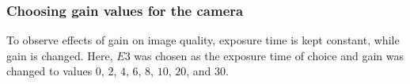 

    \subsubsection*{Choosing gain values for the camera}
        To observe effects of gain on image quality, exposure time is kept constant, while gain is changed. Here, $E3$ was chosen as the exposure time of choice and gain was changed to values $0$, $2$, $4$, $6$, $8$, $10$, $20$, and $30$.

